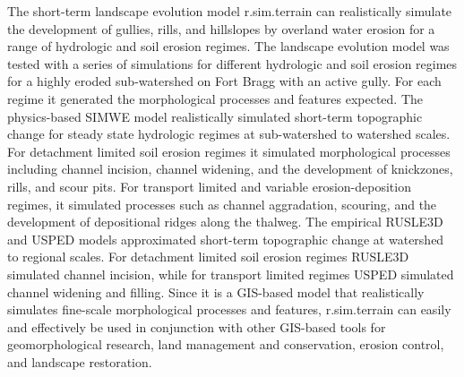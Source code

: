 \documentclass[gmd, manuscript]{copernicus}
\begin{document}
The short-term landscape evolution model 
r.sim.terrain 
can realistically simulate the development of 
gullies, rills, and hillslopes by overland water erosion
for a range of hydrologic and soil erosion regimes.
The landscape evolution model was tested
with a series of simulations for different 
hydrologic and soil erosion regimes
for a highly eroded sub-watershed on Fort Bragg
with an active gully.
For each regime it generated the 
morphological processes and features expected.
The physics-based SIMWE model 
realistically simulated short-term topographic change
for steady state hydrologic regimes
at sub-watershed to watershed scales. 
For detachment limited soil erosion regimes
it simulated morphological processes including
channel incision, channel widening, and 
the development of knickzones, rills, and scour pits.
For transport limited and variable erosion-deposition regimes,
it simulated processes such as channel aggradation,
scouring, and the development of
depositional ridges along the thalweg.
The empirical RUSLE3D and USPED models
approximated short-term topographic change
at watershed to regional scales. 
For detachment limited soil erosion regimes 
RUSLE3D simulated channel incision,
while for transport limited regimes
USPED simulated channel widening and filling. 
Since it is a GIS-based model 
that realistically simulates 
fine-scale morphological processes and features,
r.sim.terrain can easily and effectively be used 
in conjunction with other GIS-based tools
for geomorphological research,
land management and conservation,
erosion control, and landscape restoration. 


\end{document}
